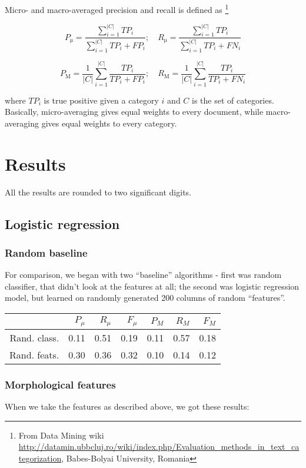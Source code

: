 \documentclass[letterpaper]{article}
\begin{document}
Micro- and macro-averaged precision and recall is defined as \footnote{From Data Mining wiki  \url{http://datamin.ubbcluj.ro/wiki/index.php/Evaluation_methods_in_text_categorization}, Babes-Bolyai University, Romania} 

$$P_{\mathrm{\mu}} = \frac{\sum_{i=1}^{|C|}TP_{i}}{\sum_{i=1}^{|C|}TP_{i}+FP_{i}}; \quad R_{\mathrm{\mu}} = \frac{\sum_{i=1}^{|C|}TP_{i}}{\sum_{i=1}^{|C|}TP_{i}+FN_{i}}$$

$$P_{\mathrm{M}}=\frac{1}{|C|}\sum_{i=1}^{|C|}\frac{TP_{i}}{TP_{i}+FP_{i}};\quad R_{\mathrm{M}}=\frac{1}{|C|}\sum_{i=1}^{|C|}\frac{TP_{i}}{TP_{i}+FN_{i}}$$

where $TP_i$ is true positive given a category $i$ and $C$ is the set of categories. Basically, micro-averaging gives equal weights to every document, while macro-averaging gives equal weights to every category.

\section{Results}
All the results are rounded to two significant digits.
\subsection{Logistic regression}
\subsubsection{Random baseline}

For comparison, we began with two ``baseline'' algorithms - first was random classifier, that didn't look at the features at all; the second was logistic regression model, but learned on randomly generated 200 columns of random ``features''.

\begin{tabular}{|r|r|r|r|r|r|r|}
 \hline
 & $P_\mu$ & $R_\mu$ & $F_\mu$ & $P_M$ & $R_M$  & $F_M$ \\ \hline
Rand. class. & 0.11 & 0.51 & 0.19 & 0.11 & 0.57 & 0.18 \\ \hline
Rand. feats. & 0.30 & 0.36 & 0.32 & 0.10 & 0.14 & 0.12 \\ \hline
\end{tabular}

\subsubsection{Morphological features}
When we take the features as described above, we got these results:
\end{document}
